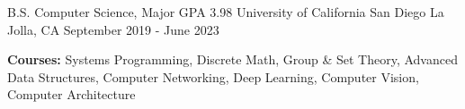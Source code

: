 
\begin{cventries}
  \cventry
    {B.S. Computer Science, Major GPA 3.98}
    {University of California San Diego}
    {La Jolla, CA}
    {September 2019 - June 2023}
    {
      \begin{cvitems}
        \item {\textbf{Courses:} Systems Programming, Discrete Math, Group \& Set Theory, Advanced Data Structures, Computer Networking, Deep Learning, Computer Vision, Computer Architecture}
      \end{cvitems}
    }
\end{cventries}
